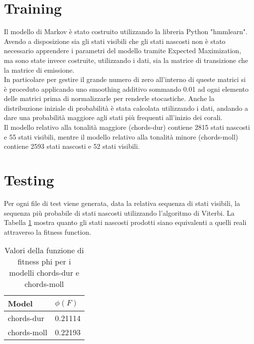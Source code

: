 \section{Training}
Il modello di Markov è stato costruito utilizzando la libreria Python "hmmlearn". \\
Avendo a disposizione sia gli stati visibili che gli stati nascosti non è stato necessario apprendere i parametri del modello tramite Expected Maximization, ma sono state invece costruite, utilizzando i dati, sia la matrice di transizione che la matrice di emissione.\\
In particolare per gestire il grande numero di zero all'interno di queste matrici si è proceduto applicando uno smoothing additivo sommando 0.01 ad ogni elemento delle matrici prima di normalizzarle per renderle stocastiche.
Anche la distribuzione iniziale di probabilità è stata calcolata utilizzando i dati, andando a dare una probabilità maggiore agli stati più frequenti all'inizio dei corali. \\
Il modello relativo alla tonalità maggiore (chords-dur) contiene 2815 stati nascosti e 55 stati visibili, mentre il modello relativo alla tonalità minore (chords-moll) contiene 2593 stati nascosti e 52 stati visibili.
\section{Testing}
Per ogni file di test viene generata, data la relativa sequenza di stati visibili, la sequenza più probabile di stati nascosti utilizzando l'algoritmo di Viterbi.
La Tabella \ref{comparison} mostra quanto gli stati nascosti prodotti siano equivalenti a quelli reali attraverso la fitness function. \\

\begin{table}[h]
	\centering
	\begin{tabular}{|l|l|}
		\hline
		Model       & $\phi(F)$     \\ \hline
		chords-dur  & 0.21114 \\ \hline
		chords-moll & 0.22193 \\ \hline
	\end{tabular}
	\caption{Valori della funzione di fitness phi per i modelli chords-dur e chords-moll}
	\label{comparison}
\end{table}

